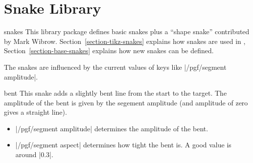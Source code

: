 %
%
%


\section{Snake Library}

\label{section-library-snakes}

\begin{pgflibrary}{snakes}
  This library package defines basic snakes plus a ``shape snake''
  contributed by Mark Wibrow.
  Section~\ref{section-tikz-snakes} explains how snakes are
  used in \tikzname, Section~\ref{section-base-snakes} explains how
  new snakes can be defined.

  The snakes are influenced by the current values of keys like
  |/pgf/segment amplitude|. 
\end{pgflibrary}


\begin{snake}{bent}
  This snake adds a slightly bent line from the start to the
  target. The amplitude of the bent is given by the segement amplitude
  (and amplitude of zero gives a straight line). 
  \begin{itemize}
  \item |/pgf/segment amplitude|
    determines the amplitude of the bent.
  \item |/pgf/segment aspect|
    determines how tight the bent is. A good value is around |0.3|. 
  \end{itemize}
\begin{codeexample}[]
\end{codeexample}
\end{snake}



